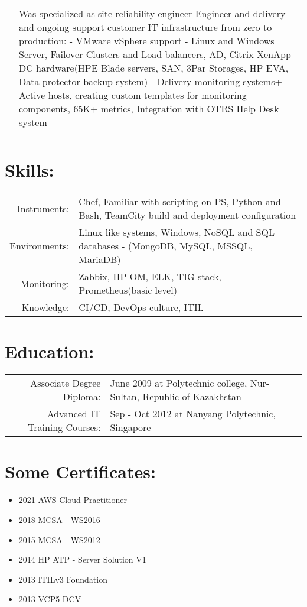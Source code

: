 \documentclass[a4paper,10pt]{article}
\begin{document}
\begin{longtable}{r|p{11cm}}
& \footnotesize{\textnormal{Was specialized as site reliability engineer Engineer and delivery and ongoing support customer IT infrastructure from zero to production:\newline
- VMware vSphere support\newline
- Linux and Windows Server, Failover Clusters and Load balancers, AD, Citrix XenApp\newline
- DC hardware(HPE Blade servers, SAN, 3Par Storages, HP EVA, Data protector backup system)\newline
- Delivery monitoring systems\newline
70+ Active hosts, creating custom templates for monitoring components, 65K+ metrics, Integration with OTRS Help Desk system}}\\
\multicolumn{2}{c}{} \\
\end{longtable}
\section*{Skills:}
\begin{tabular}{r|p{13cm}}
  Instruments: & Chef, Familiar with scripting on PS, Python and Bash, TeamCity build and deployment configuration\\
  Environments: & Linux like systems, Windows, NoSQL and SQL databases - (MongoDB, MySQL, MSSQL, MariaDB)\\
  Monitoring: & Zabbix, HP OM, ELK, TIG stack, Prometheus(basic level)\\
  Knowledge: & CI/CD, DevOps culture, ITIL\\
\end{tabular}
\section*{Education:}
\begin{tabular}{r|p{11cm}}
  Associate Degree Diploma: & June 2009 at Polytechnic college, Nur-Sultan, Republic of Kazakhstan\\
  Advanced IT Training Courses: &  Sep - Oct 2012 at Nanyang Polytechnic, Singapore\\
\end{tabular}
\section*{Some Certificates:}
\begin{itemize}
  \item 2021 AWS Cloud Practitioner
  \item 2018 MCSA - WS2016
  \item 2015 MCSA - WS2012
  \item 2014 HP ATP - Server Solution V1
  \item 2013 ITILv3 Foundation 
  \item 2013 VCP5-DCV
\end{itemize}
\end{document}
